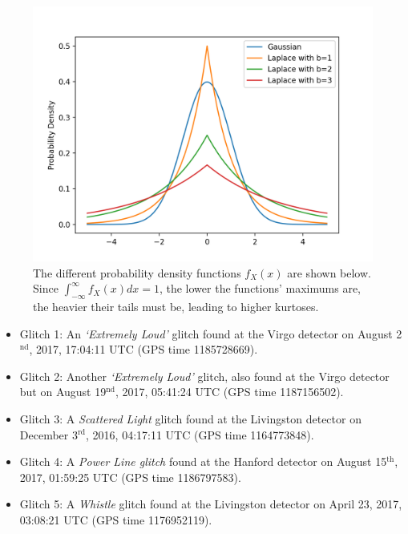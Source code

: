 \documentclass[reprint,
letterpaper,
 amsmath,amssymb,
 aps,
]{revtex4-2}
\begin{document}
\begin{figure}[h]
\caption{The different probability density functions $f_X(x)$ are shown below. Since $\int_{-\infty}^\infty f_X(x)dx = 1$, the lower the  functions' maximums are, the heavier their tails must be, leading to higher kurtoses.}
\includegraphics[scale = .54]{pdf graphs.png}
\centering
\end{figure}


\begin{itemize}
\item Glitch 1: An \textit{`Extremely Loud'} glitch found at the Virgo detector on August 2$^{\text{nd}}$, 2017, 17:04:11 UTC (GPS time 1185728669).

\item Glitch 2: Another \textit{`Extremely Loud'} glitch, also found at the Virgo detector but on August 19$^{\text{nd}}$, 2017, 05:41:24 UTC (GPS time 1187156502).

\item Glitch 3: A \textit{Scattered Light} glitch found at the Livingston detector on December 3$^{\text{rd}}$, 2016, 04:17:11 UTC (GPS time 1164773848).

\item Glitch 4: A \textit{Power Line glitch} found at the Hanford detector on August 15$^{\text{th}}$, 2017, 01:59:25 UTC (GPS time 1186797583).

\item Glitch 5: A \textit{Whistle} glitch found at the Livingston detector on April 23, 2017, 03:08:21 UTC (GPS time 1176952119).
\end{itemize}
\end{document}
